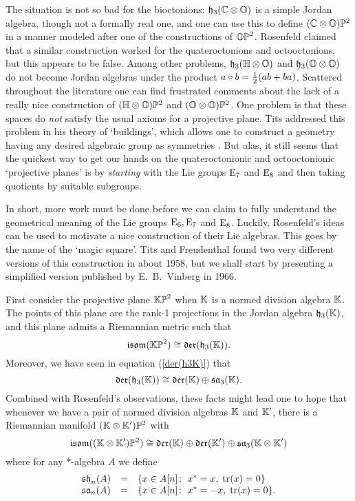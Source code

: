 The situation is not so bad for the bioctonions: ${\mathfrak {h}}_3({\mathbb C} \otimes {\mathbb O})$
is a simple Jordan algebra, though not a formally real one, and one can
use this to define $({\mathbb C} \otimes {\mathbb O}){\mathbb P}^2$ in a manner modeled after one
of the constructions of ${\mathbb {OP}}^2$.  Rosenfeld claimed that a similar
construction worked for the quateroctonions and octooctonions, but this
appears to be false.  Among other problems, ${\mathfrak {h}}_3({\mathbb H} \otimes {\mathbb O})$ and
${\mathfrak {h}}_3({\mathbb O} \otimes {\mathbb O})$  do not become Jordan algebras under the product
$a \circ b =  {1\over 2}(ab + ba)$.  Scattered throughout the literature
\cite{Besse,Freudenthal3,Freudenthal5} one can find frustrated comments
about the lack of a really nice construction of $({\mathbb H} \otimes {\mathbb O}){\mathbb P}^2$
and $({\mathbb O} \otimes {\mathbb O}){\mathbb P}^2$.  One problem is that these spaces do {\it
not} satisfy the usual axioms for a projective plane.   Tits addressed
this problem in his theory of `buildings', which allows one to construct
a geometry having any desired algebraic group as symmetries
\cite{Tits4}.  But alas, it still seems that the quickest way to get our
hands on the quateroctonionic and octooctonionic `projective planes' is
by {\it starting} with the Lie groups ${\rm E}_7$ and ${\rm E}_8$ and then taking
quotients by suitable subgroups.

In short, more work must be done before we can claim to fully understand
the geometrical meaning of the Lie groups ${\rm E}_6, {\rm E}_7$ and ${\rm E}_8$. 
Luckily, Rosenfeld's ideas can be used to motivate a nice construction
of their Lie algebras.  This goes by the name of the `magic square'.  
Tits \cite{Tits3} and Freudenthal \cite{Freudenthal2} found two very
different versions of this construction in about 1958, but we shall
start by presenting a simplified version published by E.\ B.\ Vinberg
\cite{Vinberg} in 1966.

First consider the projective plane ${\mathbb {KP}}^2$ when ${\mathbb K}$ is a normed
division algebra ${\mathbb K}$.  The points of this plane are the rank-1
projections in the Jordan algebra ${\mathfrak {h}}_3({\mathbb K})$, and this plane admits a
Riemannian metric such that
\[   {\mathfrak {isom}}({\mathbb {KP}}^2) \cong {\mathfrak {der}}({\mathfrak {h}}_3({\mathbb K})). \] 
Moreover, we have seen in equation (\ref{der(h3K)}) that 
\[   {\mathfrak {der}}({\mathfrak {h}}_3({\mathbb K})) \cong {\mathfrak {der}}({\mathbb K}) \oplus {\mathfrak {sa}}_3({\mathbb K}) . \]
Combined with Rosenfeld's observations, these facts might lead one to 
hope that whenever we have a pair of normed division algebras ${\mathbb K}$ and 
${\mathbb K}'$, there is a Riemannian manifold $({\mathbb K} \otimes {\mathbb K}'){\mathbb P}^2$ with
\[   {\mathfrak {isom}}(({\mathbb K}\otimes {\mathbb K}'){\mathbb P}^2) \cong 
{\mathfrak {der}}({\mathbb K}) \oplus {\mathfrak {der}}({\mathbb K}') \oplus {\mathfrak {sa}}_3({\mathbb K} \otimes {\mathbb K}')  \]
where for any $\ast$-algebra $A$ we define
\[
\begin{array}{lcl}
    {\mathfrak {sh}}_n(A) & =& \{ x \in A[n] \colon \; x^* = x, \; {\rm tr}(x) = 0\}   \\
    {\mathfrak {sa}}_n(A) & =& \{ x \in A[n] \colon \; x^* = -x, \; {\rm tr}(x) = 0\}.  
\end{array}
\]

